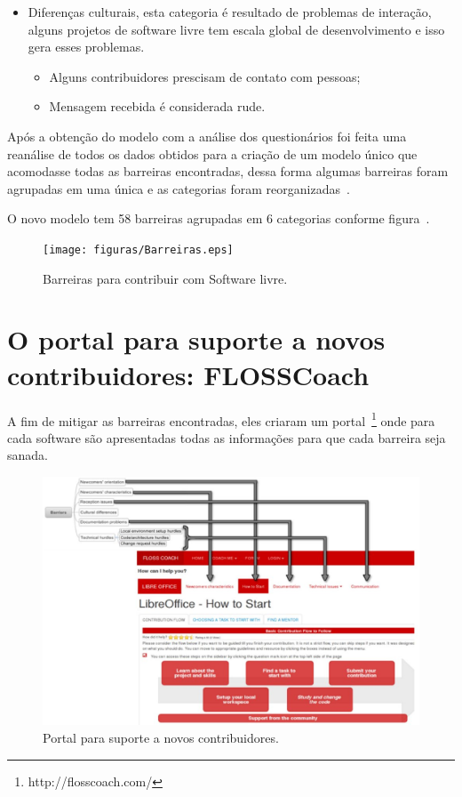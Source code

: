 \begin{itemize}
\item Diferenças culturais, esta categoria é resultado de problemas de interação, 
alguns projetos de software livre tem escala global de desenvolvimento e isso
gera esses problemas.
	\begin{itemize}
	\item Alguns contribuidores prescisam de contato com pessoas;
	\item Mensagem recebida é considerada rude.
	\end{itemize}
	
\end{itemize}

Após a obtenção do modelo com a análise dos questionários foi feita uma reanálise
de todos os dados obtidos para a criação de um modelo único que acomodasse todas
as barreiras encontradas, dessa forma algumas barreiras foram agrupadas em uma única e 
as categorias foram reorganizadas~\cite{6943482}.

O novo modelo tem 58 barreiras agrupadas em 6 categorias conforme figura~\cite{Steinmacher:2016:OOS:2884781.2884806}.

\begin{figure}[h]
	\centering
	\label{fig:barreiras}
		\texttt{[image: figuras/Barreiras.eps]}
	\caption{Barreiras para contribuir com Software livre.}
\end{figure}

\section{O portal para suporte a novos contribuidores: FLOSSCoach}
\label{flosscoach}

A fim de mitigar as barreiras encontradas, eles criaram um portal~\footnote{http://flosscoach.com/} 
onde para cada software são apresentadas todas as informações para que cada barreira seja sanada.

\begin{figure}[h]
	\centering
	\label{portalFlossCoach}
		\includegraphics[keepaspectratio=true,scale=0.4]{figuras/portal.eps}
	\caption{Portal para suporte a novos contribuidores.}
\end{figure}

